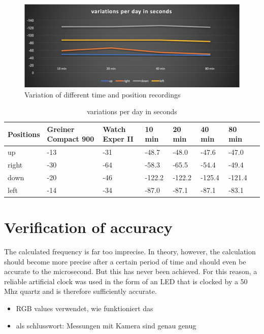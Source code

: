 \documentclass[12pt, a4paper]{report}
\begin{document}
    \noindent
    \begin{figure}[H]
        \includegraphics[scale=0.5]{Images/variations_per_day.png}
    
    \caption{ Variation of different time and position recordings}
    \end{figure}    
    
    \begin{table}[H]
      \centering
        \begin{tabularx}{\linewidth}{ |L|L|L|L|L|L|L|L|  }
        \hline
        {\fontsize{10}{12}\selectfont \textbf{Positions}} &{\fontsize{9}{10}\selectfont \textbf{Greiner Compact 900}} & {\fontsize{10}{12}\selectfont \textbf{Watch Exper II}} & {\fontsize{10}{12}\selectfont \textbf{10 min}} &  {\fontsize{10}{12}\selectfont \textbf{20 min}} &  {\fontsize{10}{12}\selectfont \textbf{40 min}} & {\fontsize{10}{12}\selectfont  \textbf{80 min}} \\ \hline
        up        & -13                 &      -31  & -48.7     & -48.0     & -47.6      & -47.0      \\ \hline
        right     & -30                 &      -64  & -58.3      & -65.5    & -54.4      & -49.4      \\ \hline
        down      & -20               &  -46  & -122.2    & -122.2     & -125.4    & -121.4      \\ \hline
        left      & -14                & -34 & -87.0	   & -87.1	  & -87.1	  & -83.1      \\ \hline
        \end{tabularx}
          \caption{ variations per day in seconds} 
    \end{table}
    
    \section{Verification of accuracy}
    The calculated frequency is far too imprecise. In theory, however, the calculation should become more precise after a certain period of time and should even be accurate to the microsecond.
    But this has never been achieved. For this reason, a reliable artificial clock was used in the form of an LED that is clocked by a 50 Mhz quartz and is therefore sufficiently accurate.
    \begin{itemize}
    \item RGB values verwendet, wie funktioniert das
    \item als schlusswort: Messungen mit Kamera sind genau genug
    \end{itemize}
   
\end{document}
